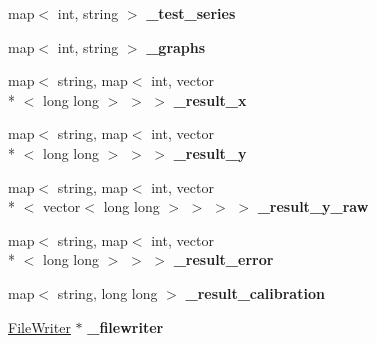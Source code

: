 \begin{DoxyCompactItemize}
\item 
\hypertarget{classAbstractBenchmark_a79144bd7a20f5e0dc086951e823efc52}{map$<$ int, string $>$ {\bfseries \-\_\-test\-\_\-series}}\label{classAbstractBenchmark_a79144bd7a20f5e0dc086951e823efc52}

\item 
\hypertarget{classAbstractBenchmark_a86f7ade941602307b4397b0dc486465e}{map$<$ int, string $>$ {\bfseries \-\_\-graphs}}\label{classAbstractBenchmark_a86f7ade941602307b4397b0dc486465e}

\item 
\hypertarget{classAbstractBenchmark_a6d179e3bd1a796c22aa88f2514aa7b67}{map$<$ string, map$<$ int, vector\\*
$<$ long long $>$ $>$ $>$ {\bfseries \-\_\-result\-\_\-x}}\label{classAbstractBenchmark_a6d179e3bd1a796c22aa88f2514aa7b67}

\item 
\hypertarget{classAbstractBenchmark_a49bc6f76d0a6e5c1ce38f4c0f847b0e0}{map$<$ string, map$<$ int, vector\\*
$<$ long long $>$ $>$ $>$ {\bfseries \-\_\-result\-\_\-y}}\label{classAbstractBenchmark_a49bc6f76d0a6e5c1ce38f4c0f847b0e0}

\item 
\hypertarget{classAbstractBenchmark_a03e6c5bdcf42c345fe3439ee0225089a}{map$<$ string, map$<$ int, vector\\*
$<$ vector$<$ long long $>$ $>$ $>$ $>$ {\bfseries \-\_\-result\-\_\-y\-\_\-raw}}\label{classAbstractBenchmark_a03e6c5bdcf42c345fe3439ee0225089a}

\item 
\hypertarget{classAbstractBenchmark_a8511c6b0d2515bbe105e2664dfe5024d}{map$<$ string, map$<$ int, vector\\*
$<$ long long $>$ $>$ $>$ {\bfseries \-\_\-result\-\_\-error}}\label{classAbstractBenchmark_a8511c6b0d2515bbe105e2664dfe5024d}

\item 
\hypertarget{classAbstractBenchmark_a0f0a9990da3384e56a08b44b5b4cc152}{map$<$ string, long long $>$ {\bfseries \-\_\-result\-\_\-calibration}}\label{classAbstractBenchmark_a0f0a9990da3384e56a08b44b5b4cc152}

\item 
\hypertarget{classAbstractBenchmark_a0e41d86866f7d4274ca8eb78ad65d257}{\hyperlink{classFileWriter}{File\-Writer} $\ast$ {\bfseries \-\_\-filewriter}}\label{classAbstractBenchmark_a0e41d86866f7d4274ca8eb78ad65d257}


\end{DoxyCompactItemize}
